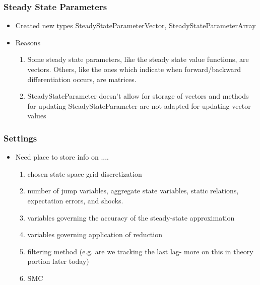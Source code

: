 \documentclass{beamer}
\begin{document}
\begin{frame}
  \frametitle{Steady State Parameters}
  \begin{itemize}
  \item Created new types SteadyStateParameterVector, SteadyStateParameterArray
  \item Reasons
    \begin{enumerate}
    \item Some steady state parameters, like the steady state value functions, are vectors. Others, like the ones which indicate when forward/backward differentiation occurs, are matrices.
    \item SteadyStateParameter doesn't allow for storage of vectors and methods for updating SteadyStateParameter are not adapted for updating vector values
    \end{enumerate}
  \end{itemize}
\end{frame}

\begin{frame}
\frametitle{Settings} %
\begin{itemize}
\item Need place to store info on ....
  \begin{enumerate}
  \item chosen state space grid discretization
  \item number of jump variables, aggregate state variables, static relations, expectation errors, and shocks.
  \item variables governing the accuracy of the steady-state approximation
  \item variables governing application of reduction
  \item filtering method (e.g. are we tracking the last lag- more on this in theory portion later today)
  \item SMC
  \end{enumerate}
\end{itemize}
\end{frame}
\end{document}
